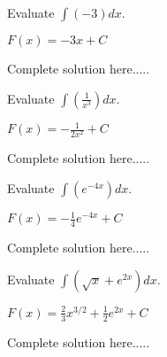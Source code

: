 \begin{example}
Evaluate $\displaystyle\int (-3) dx$. 
    \begin{sol}
     $F(x)=-3x+C$ 
    \end{sol}
    \begin{solL}
    Complete solution here.....
    
    \end{solL}
    
\end{example}
\begin{example}
Evaluate $\displaystyle\int \left(\frac{1}{x^3}\right) dx$. 
    \begin{sol}
     $F(x)=-\displaystyle\frac{1}{2x^2}+C$ 
    \end{sol}
    \begin{solL}
    Complete solution here.....
    
    \end{solL}
    
\end{example}
\begin{example}
Evaluate $\displaystyle\int \left(e^{-4x}\right) dx$. 
    \begin{sol}
     $F(x)=-\displaystyle\frac{1}{4}e^{-4x}+C$ 
    \end{sol}
    \begin{solL}
    Complete solution here.....
    
    \end{solL}
    
\end{example}
\begin{example}
Evaluate $\displaystyle\int \left(\sqrt{x}+e^{2x}\right) dx$. 
    \begin{sol}
     $F(x)=\displaystyle\frac{2}{3}x^{3/2}+\frac{1}{2}e^{2x}+C$ 
    \end{sol}
    \begin{solL}
    Complete solution here.....
    
    \end{solL}
    
\end{example}
